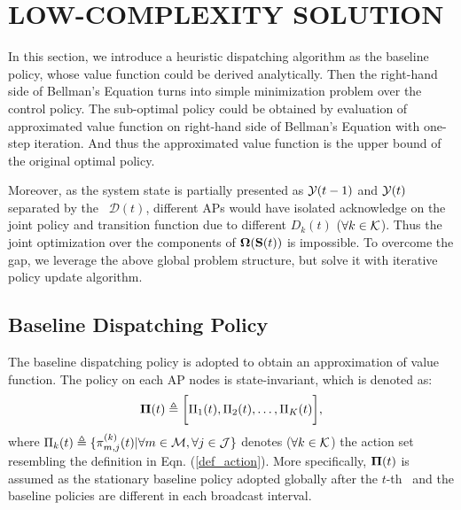 \section{LOW-COMPLEXITY SOLUTION}
In this section, we introduce a heuristic dispatching algorithm as the baseline policy, whose value function could be derived analytically.
Then the right-hand side of Bellman's Equation turns into simple minimization problem over the control policy. The sub-optimal policy could be obtained by evaluation of approximated value function on right-hand side of Bellman's Equation with one-step iteration. And thus the approximated value function is the upper bound of the original optimal policy.

Moreover, as the system state is partially presented as $\mathcal{Y}({t-1})$ and $\mathcal{Y}(t)$ separated by the \brdelay~$\mathcal{D}(t)$, different APs would have isolated acknowledge on the joint policy and transition function due to different $D_k(t)$ ($\forall k\in\mathcal{K}$).
Thus the joint optimization over the components of $\boldsymbol{\Omega}(\mathbf{S}(t))$ is impossible.
To overcome the gap, we leverage the above global problem structure, but solve it with iterative policy update algorithm.

\subsection{Baseline Dispatching Policy}
The baseline dispatching policy is adopted to obtain an approximation of value function. The policy on each AP nodes is state-invariant, which is denoted as:
\begin{align}
    \boldsymbol{\Pi}(t) \triangleq \bigg[\Pi_1(t), \Pi_2(t), \dots, \Pi_K(t)\bigg],
\end{align}
where $\Pi_k(t) \triangleq \{\pi^{(k)}_{m,j}(t) | \forall m\in\mathcal{M},\forall j\in\mathcal{J}\}$ denotes ($\forall k\in\mathcal{K}$) the action set resembling the definition in Eqn. (\ref{def_action}).
More specifically, $\boldsymbol{\Pi}(t)$ is assumed as the stationary baseline policy adopted globally after the $t$-th \brpoint~and the baseline policies are different in each broadcast interval.

